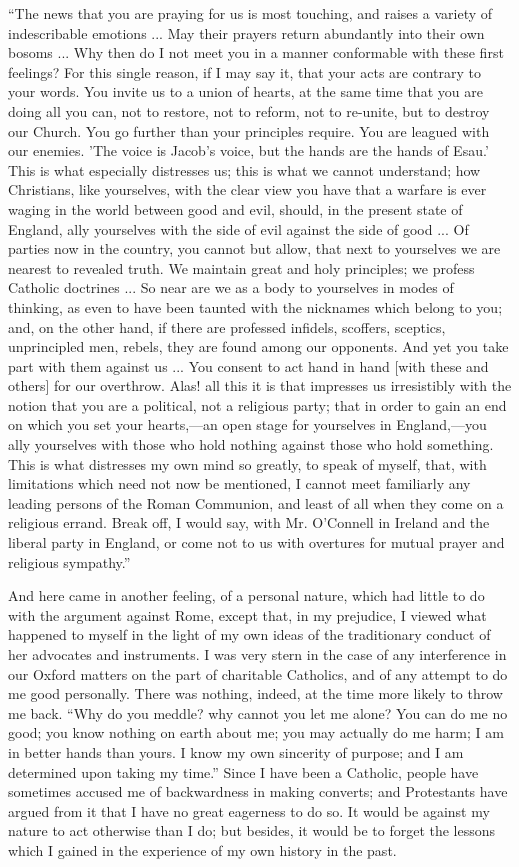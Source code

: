 ``The news that you are praying for us is most touching, and
raises a variety of indescribable emotions ... May their
prayers return abundantly into their own bosoms ... Why then do I
not meet you in a manner conformable with these first feelings? For this
single reason, if I may say it, that your acts are contrary to
your words. You invite us to a union of hearts, at the same time that
you are doing all you can, not to restore, not to reform, not to
re-unite, but to destroy our Church. You go further than your principles
require. You are leagued with our enemies. 'The voice is Jacob's voice,
but the hands are the hands of Esau.' This is what especially distresses
us; this is what we cannot understand; how Christians, like yourselves,
with the clear view you have that a warfare is ever waging in the world
between good and evil, should, in the present state of England, ally
yourselves with the side of evil against the side of good ... Of parties
now in the country, you cannot but allow, that next to yourselves we are
nearest to revealed truth. We maintain great and holy principles; we
profess Catholic doctrines ... So near are we as a body to yourselves in
modes of thinking, as even to have been taunted with the nicknames which
belong to you; and, on the other hand, if there are professed infidels,
scoffers, sceptics, unprincipled men, rebels, they are found among our
opponents. And yet you take part with them against us ... You consent to
act hand in hand [with these and others] for our overthrow.
Alas! all this it is that impresses us irresistibly with the notion that
you are a political, not a religious party; that in order to gain an
end on which you set your hearts,—an open stage for yourselves in
England,—you ally yourselves with those who hold nothing against those
who hold something. This is what distresses my own mind so greatly, to
speak of myself, that, with limitations which need not now be mentioned,
I cannot meet familiarly any leading persons of the Roman Communion, and
least of all when they come on a religious errand. Break off, I would
say, with Mr. O'Connell in Ireland and the liberal party in England, or
come not to us with overtures for mutual prayer and religious
sympathy.''

And here came in another feeling, of a personal nature,
which had little to do with the argument against Rome, except that, in
my prejudice, I viewed what happened to myself in the light of my own ideas of the
traditionary conduct of her advocates and instruments. I was very
stern in the case of any interference in our Oxford matters on the part
of charitable Catholics, and of any attempt to do me good
personally. There was nothing, indeed, at the time more likely to throw
me back. ``Why do you meddle? why cannot you let me alone? You can
do me no good; you know nothing on earth about me; you may actually do
me harm; I am in better hands than yours. I know my own sincerity of
purpose; and I am determined upon taking my time.'' Since I have
been a Catholic, people have sometimes accused me of backwardness in
making converts; and Protestants have argued from it that I have no
great eagerness to do so. It would be against my nature to act otherwise
than I do; but besides, it would be to forget the lessons which I gained
in the experience of my own history in the past.

